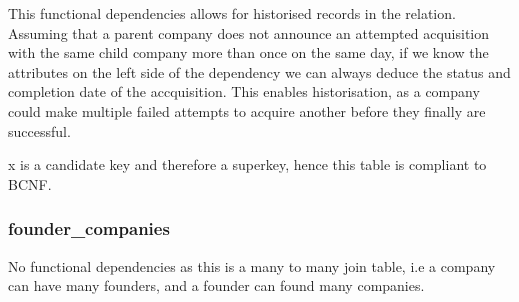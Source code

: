 \documentclass[12pt]{article}
\begin{document}
This functional dependencies allows for historised records in the relation. Assuming that a parent company does not announce an attempted acquisition with the same child company more than once on the same day, if we know the attributes on the left side of the dependency we can always deduce the status and completion date of the accquisition. This enables historisation, as a company could make multiple failed attempts to acquire another before they finally are successful.

x is a candidate key and therefore a superkey, hence this table is compliant to BCNF.

\subsubsection{founder\_companies}
No functional dependencies as this is a many to many join table, i.e a company can have many founders, and a founder can found many companies.
\end{document}
